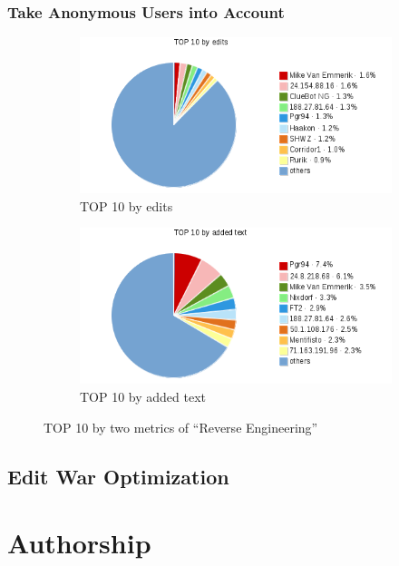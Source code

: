 \documentclass[preprint,review,12pt]{elsarticle}
\begin{document}
\subsubsection{Take Anonymous Users into Account}

\begin{figure}[h]
  \centering

    \begin{subfigure}{0.5\textwidth}
    \centering \includegraphics[width=0.9\linewidth]{pic/wiki1.png}
    \caption{TOP 10 by edits}
    \label{fig:wiki1}
    \end{subfigure}

    \begin{subfigure}{0.5\textwidth}
    \centering \includegraphics[width=0.9\linewidth]{pic/wiki2.png}
    \caption{TOP 10 by added text}%
    \label{fig:wiki1}
    \end{subfigure}

  \caption{TOP 10 by two metrics of ``Reverse Engineering''}
\end{figure}


\subsection{Edit War Optimization}

\section{Authorship}
\end{document}
